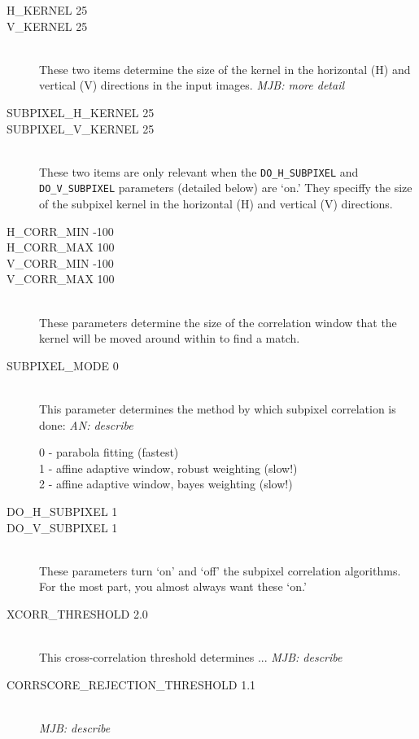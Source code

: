 \begin{description}
\item[H\_KERNEL 25]
\item[V\_KERNEL 25] \hfill \\
These two items determine the size of the kernel in the horizontal (H) and vertical (V) directions in the input images.  \emph{MJB: more detail}

\item[SUBPIXEL\_H\_KERNEL 25]
\item[SUBPIXEL\_V\_KERNEL 25] \hfill \\
These two items are only relevant when the \texttt{DO\_H\_SUBPIXEL} and \texttt{DO\_V\_SUBPIXEL} parameters (detailed below) are `on.'  They speciffy the size of the subpixel kernel in the horizontal (H) and vertical (V) directions.

\item[H\_CORR\_MIN -100]
\item[H\_CORR\_MAX 100]
\item[V\_CORR\_MIN -100]
\item[V\_CORR\_MAX 100] \hfill \\
These parameters determine the size of the correlation window that the kernel will be moved around within to find a match.

\item[SUBPIXEL\_MODE 0] \hfill \\
This parameter determines the method by which subpixel correlation is done:
\emph{AN: describe}
	\begin{description}
	\item[0 - parabola fitting (fastest)]
	\item[1 - affine adaptive window, robust weighting (slow!)]
	\item[2 - affine adaptive window, bayes weighting (slow!)]
	\end{description}

\item[DO\_H\_SUBPIXEL 1]
\item[DO\_V\_SUBPIXEL 1] \hfill \\
These parameters turn `on' and `off' the subpixel correlation
algorithms.  For the most part, you almost always want these `on.'

\item[XCORR\_THRESHOLD 2.0] \hfill \\
This cross-correlation threshold determines ... \emph{MJB: describe}

\item[CORRSCORE\_REJECTION\_THRESHOLD 1.1] \hfill \\
\emph{MJB: describe}


\end{description}
